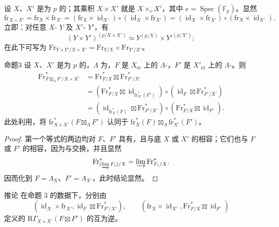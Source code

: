 设 $X$、$X'$ 是为 $p$ 的；其乘积 $X\times X'$ 就是 $X\times_eX'$，其中 $e=\operatorname{Spec}(\mathbb F_p)$。显然
\[
\mathrm{fr}_{X\times X'}=\mathrm{fr}_X\times\mathrm{fr}_{X'}
=(\mathrm{fr}_X\times\operatorname{id}_{X'})\circ(\operatorname{id}_X\times\mathrm{fr}_{X'})
=(\operatorname{id}_X\times\mathrm{fr}_{X'})\circ(\mathrm{fr}_X\times\operatorname{id}_{X'}).
\]
立即：对任意 $X$- $Y$ 及 $X'$- $Y'$，有
\[
(Y\times Y')^{(p/X\times X')}\simeq Y^{(p/X)}\times Y'^{(p/X')};
\]
在此下可写为
$\mathrm{Fr}_{Y\times Y'/X\times X'}=\mathrm{Fr}_{Y/X}\times\mathrm{Fr}_{Y'/X'}$。
\begin{SGAresult}{命题}{3}
设 $X$、$X'$ 是为 $p$ 的，$\Lambda$ 为，$F$ 是 $X_{\text{ét}}$ 上的 $\Lambda$-，$F'$ 是 $X'_{\text{ét}}$ 上的 $\Lambda$-。则
\[
\begin{aligned}
\mathrm{Fr}_{F\boxtimes_\Lambda F'/X\times X'}^{*}
&=\mathrm{Fr}_{F/X}^{*}\boxtimes\mathrm{Fr}_{F'/X'}^{*}\\
&=(\mathrm{Fr}_{F/X}^{*}\boxtimes\operatorname{id}_{\mathrm{fr}_{X'}^*(F')})
\circ(\operatorname{id}_F\boxtimes\mathrm{Fr}_{F'/X'}^{*})\\
&=(\operatorname{id}_{\mathrm{fr}_X^*(F)}\boxtimes\mathrm{Fr}_{F'/X'}^{*})
\circ(\mathrm{Fr}_{F/X}^{*}\boxtimes\operatorname{id}_{F'}).
\end{aligned}
\]
此处利用，将 $\mathrm{fr}_{X\times X'}^*(F\boxtimes_\Lambda F')$ 认同于 $\mathrm{fr}_X^*(F)\boxtimes_\Lambda\mathrm{fr}_{X'}^*(F')$。
\end{SGAresult}
\begin{proof}
第一个等式的两边均对 $F$、$F'$ 具有，且与底 $X$ 或 $X'$ 的相容；它们也与 $F$ 或 $F'$ 的相容，因为与交换，并且显然
\[
\mathrm{Fr}_{(\varinjlim F_i)/X}^{*}=\varinjlim\mathrm{Fr}_{F_i/X}^{*}.
\]
因而化到 $F=\Lambda_X$、$F'=\Lambda_{X'}$，此时结论显然。
\end{proof}
\begin{SGAresult}{推论}{}
在命题 3 的数据下，分别由
\[
(\operatorname{id}_X\times\mathrm{fr}_{X'},\operatorname{id}_F\boxtimes\mathrm{Fr}_{F'/X'}^{*}),\qquad
(\mathrm{fr}_X\times\operatorname{id}_{X'},\mathrm{Fr}_{F/X}^{*}\boxtimes\operatorname{id}_{F'})
\]
定义的 $\mathrm R\Gamma_{X\times X'}(F\boxtimes F')$ 的互为逆。
\end{SGAresult}
